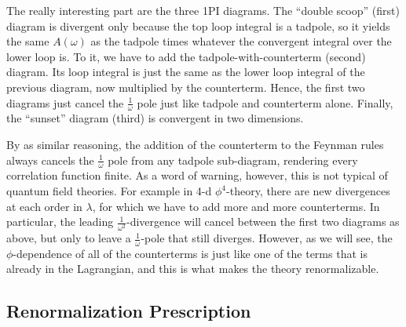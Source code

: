 The really interesting part are the three 1PI diagrams. The ``double
scoop'' (first) diagram is divergent only because the top loop
integral is a tadpole, so it yields the same $A(\omega)$ as the
tadpole times whatever the convergent integral over the lower loop
is. To it, we have to add the tadpole-with-counterterm (second)
diagram. Its loop integral is just the same as the lower loop integral
of the previous diagram, now multiplied by the counterterm. Hence, the
first two diagrams just cancel the $\frac{1}{\omega}$ pole just like
tadpole and counterterm alone. Finally, the ``sunset'' diagram (third)
is convergent in two dimensions.

By as similar reasoning, the addition of the counterterm to the
Feynman rules always cancels the $\frac{1}{\omega}$ pole from any
tadpole sub-diagram, rendering every correlation function finite. As a
word of warning, however, this is not typical of quantum field
theories. For example in 4-d $\phi^4$-theory, there are new
divergences at each order in $\lambda$, for which we have to add more
and more counterterms. In particular, the leading
$\frac{1}{\omega^2}$-divergence will cancel between the first two
diagrams as above, but only to leave a $\frac{1}{\omega}$-pole that
still diverges. However, as we will see, the $\phi$-dependence of all
of the counterterms is just like one of the terms that is already in
the Lagrangian, and this is what makes the theory renormalizable.


\subsection{Renormalization Prescription}

